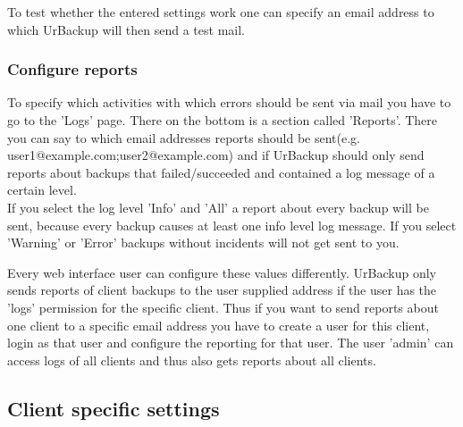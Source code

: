 \documentclass[a4paper,10pt]{article}
\begin{document}
To test whether the entered settings work one can specify an email address to which UrBackup will then send a test mail.

\subsubsection{Configure reports}
\label{subsub:configure_reports}

To specify which activities with which errors should be sent via mail you have to go to the 'Logs' page. There on the bottom is a section called 'Reports'.
There you can say to which email addresses reports should be sent(e.g. user1@example.com;user2@example.com) and if UrBackup should only send reports about backups that
failed/succeeded and contained a log message of a certain level.\\
If you select the log level 'Info' and 'All' a report about every backup will be sent, because every backup causes at least one info level log message. If you select 'Warning' or 'Error' backups without incidents will not get sent to you.

Every web interface user can configure these values differently. UrBackup only sends reports of client backups to the user supplied address if the user has the 'logs' permission for the specific client. Thus if you want to send reports about one client to a specific email address you have to create a user for this client, login as that user and configure the reporting for that user. The user 'admin' can access logs of all clients and thus also gets reports about all clients.

\subsection{Client specific settings}
\end{document}
